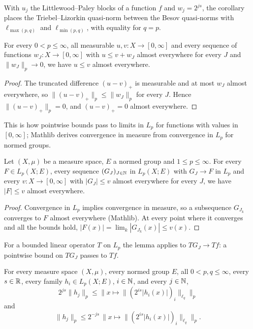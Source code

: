 With $u_j$ the Littlewood--Paley blocks of a function $f$ and $w_j = 2^{js}$, the corollary
places the Triebel--Lizorkin quasi-norm between the Besov quasi-norms with $\ell_{\max(p,q)}$
and $\ell_{\min(p,q)}$, with equality for $q = p$.

\begin{lemma}
\label{lem:limits-of-pointwise-bounds}
\leanok
For every $0 < p \leq \infty$, all measurable $u, v : X \to [0, \infty]$ and every sequence of
functions $w_J : X \to [0, \infty]$ with $u \leq v + w_J$ almost everywhere for every $J$ and
$\|w_J\|_p \to 0$, we have $u \leq v$ almost everywhere.
\end{lemma}

\begin{proof}
\leanok
The truncated difference $(u - v)_+$ is measurable and at most $w_J$ almost everywhere, so
$\|(u - v)_+\|_p \leq \|w_J\|_p$ for every $J$. Hence $\|(u - v)_+\|_p = 0$, and $(u - v)_+ = 0$
almost everywhere.
\end{proof}

This is how pointwise bounds pass to limits in $L_p$ for functions with values in
$[0, \infty]$; Mathlib derives convergence in measure from convergence in $L_p$ for normed
groups.

\begin{lemma}
\label{lem:lp-limits-pointwise}
\leanok
Let $(X, \mu)$ be a measure space, $E$ a normed group and $1 \leq p \leq \infty$. For every
$F \in L_p(X; E)$, every sequence $(G_J)_{J \in \mathbb{N}}$ in $L_p(X; E)$ with $G_J \to F$ in $L_p$
and every $v : X \to [0, \infty]$ with $|G_J| \leq v$ almost everywhere for every $J$, we have
$|F| \leq v$ almost everywhere.
\end{lemma}

\begin{proof}
\leanok
Convergence in $L_p$ implies convergence in measure, so a subsequence $G_{J_k}$ converges to $F$
almost everywhere (Mathlib). At every point where it converges and all the bounds hold,
$|F(x)| = \lim_k |G_{J_k}(x)| \leq v(x)$.
\end{proof}

For a bounded linear operator $T$ on $L_p$ the lemma applies to $T G_J \to T f$: a pointwise bound
on $T G_J$ passes to $T f$.

\begin{lemma}
\label{lem:mixed-norm-member}
\leanok
{}
For every measure space $(X, \mu)$, every normed group $E$, all $0 < p, q \leq \infty$, every
$s \in \mathbb{R}$, every family $h_i \in L_p(X; E)$, $i \in \mathbb{N}$, and every $j \in \mathbb{N}$,
\[
  2^{js} \|h_j\|_p \leq \bigl\| x \mapsto \|(2^{is} |h_i(x)|)_i\|_{\ell_q} \bigr\|_p
\]
and
\[
  \|h_j\|_p \leq 2^{-js} \, \bigl\| x \mapsto \|(2^{is} |h_i(x)|)_i\|_{\ell_q} \bigr\|_p .
\]
\end{lemma}

